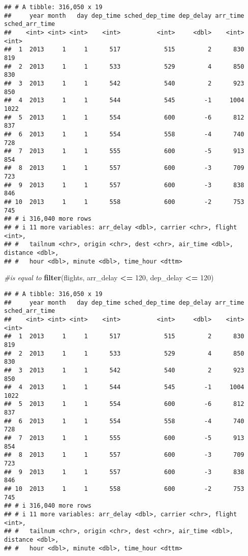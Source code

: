 \documentclass[
]{article}
\newenvironment{Shaded}{\begin{snugshade}}{\end{snugshade}}
\newcommand{\CommentTok}[1]{\textcolor[rgb]{0.56,0.35,0.01}{\textit{#1}}}
\newcommand{\DecValTok}[1]{\textcolor[rgb]{0.00,0.00,0.81}{#1}}
\newcommand{\FunctionTok}[1]{\textcolor[rgb]{0.13,0.29,0.53}{\textbf{#1}}}
\newcommand{\NormalTok}[1]{#1}
\newcommand{\SpecialCharTok}[1]{\textcolor[rgb]{0.81,0.36,0.00}{\textbf{#1}}}
\begin{document}
\begin{verbatim}
## # A tibble: 316,050 x 19
##     year month   day dep_time sched_dep_time dep_delay arr_time sched_arr_time
##    <int> <int> <int>    <int>          <int>     <dbl>    <int>          <int>
##  1  2013     1     1      517            515         2      830            819
##  2  2013     1     1      533            529         4      850            830
##  3  2013     1     1      542            540         2      923            850
##  4  2013     1     1      544            545        -1     1004           1022
##  5  2013     1     1      554            600        -6      812            837
##  6  2013     1     1      554            558        -4      740            728
##  7  2013     1     1      555            600        -5      913            854
##  8  2013     1     1      557            600        -3      709            723
##  9  2013     1     1      557            600        -3      838            846
## 10  2013     1     1      558            600        -2      753            745
## # i 316,040 more rows
## # i 11 more variables: arr_delay <dbl>, carrier <chr>, flight <int>,
## #   tailnum <chr>, origin <chr>, dest <chr>, air_time <dbl>, distance <dbl>,
## #   hour <dbl>, minute <dbl>, time_hour <dttm>
\end{verbatim}

\begin{Shaded}
\begin{Highlighting}[]
\CommentTok{\#is equal to}
\FunctionTok{filter}\NormalTok{(flights, arr\_delay }\SpecialCharTok{\textless{}=} \DecValTok{120}\NormalTok{, dep\_delay }\SpecialCharTok{\textless{}=} \DecValTok{120}\NormalTok{)}
\end{Highlighting}
\end{Shaded}

\begin{verbatim}
## # A tibble: 316,050 x 19
##     year month   day dep_time sched_dep_time dep_delay arr_time sched_arr_time
##    <int> <int> <int>    <int>          <int>     <dbl>    <int>          <int>
##  1  2013     1     1      517            515         2      830            819
##  2  2013     1     1      533            529         4      850            830
##  3  2013     1     1      542            540         2      923            850
##  4  2013     1     1      544            545        -1     1004           1022
##  5  2013     1     1      554            600        -6      812            837
##  6  2013     1     1      554            558        -4      740            728
##  7  2013     1     1      555            600        -5      913            854
##  8  2013     1     1      557            600        -3      709            723
##  9  2013     1     1      557            600        -3      838            846
## 10  2013     1     1      558            600        -2      753            745
## # i 316,040 more rows
## # i 11 more variables: arr_delay <dbl>, carrier <chr>, flight <int>,
## #   tailnum <chr>, origin <chr>, dest <chr>, air_time <dbl>, distance <dbl>,
## #   hour <dbl>, minute <dbl>, time_hour <dttm>
\end{verbatim}
\end{document}
